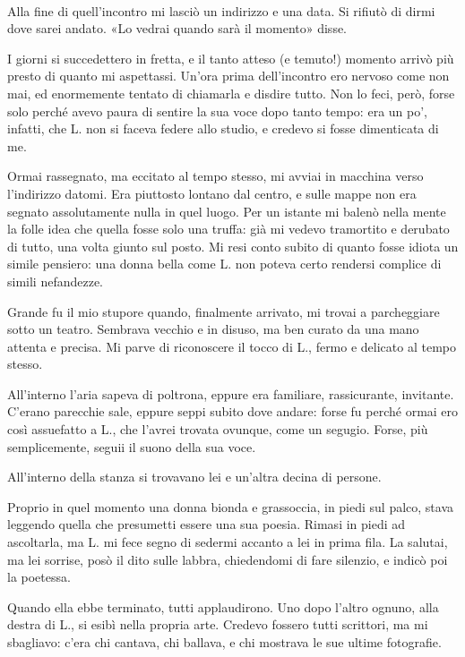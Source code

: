 \documentclass[a4paper,12pt]{book}
\begin{document}
\paragraph{}
Alla fine di quell’incontro mi lasciò un indirizzo e una data. Si rifiutò di
dirmi dove sarei andato. «Lo vedrai quando sarà il momento» disse.

I giorni si succedettero in fretta, e il tanto atteso (e temuto!) momento
arrivò più presto di quanto mi aspettassi. Un’ora prima dell’incontro ero
nervoso come non mai, ed enormemente tentato di chiamarla e disdire tutto. Non
lo feci, però, forse solo perché avevo paura di sentire la sua voce dopo tanto
tempo: era un po’, infatti, che L. non si faceva federe allo studio, e credevo
si fosse dimenticata di me.

Ormai rassegnato, ma eccitato al tempo stesso, mi avviai in macchina verso
l’indirizzo datomi. Era piuttosto lontano dal centro, e sulle mappe non era
segnato assolutamente nulla in quel luogo. Per un istante mi balenò nella mente
la folle idea che quella fosse solo una truffa: già mi vedevo tramortito e
derubato di tutto, una volta giunto sul posto. Mi resi conto subito di quanto
fosse idiota un simile pensiero: una donna bella come L. non poteva certo
rendersi complice di simili nefandezze.

Grande fu il mio stupore quando, finalmente arrivato, mi trovai a parcheggiare
sotto un teatro. Sembrava vecchio e in disuso, ma ben curato da una mano attenta
e precisa. Mi parve di riconoscere il tocco di L., fermo e delicato al tempo
stesso.

All’interno l’aria sapeva di poltrona, eppure era familiare, rassicurante,
invitante. C’erano parecchie sale, eppure seppi subito dove andare: forse fu
perché ormai ero così assuefatto a L., che l’avrei trovata ovunque, come un
segugio. Forse, più semplicemente, seguii il suono della sua voce.

All’interno della stanza si trovavano lei e un’altra decina di persone.

Proprio in quel momento una donna bionda e grassoccia, in piedi sul palco, stava
leggendo quella che presumetti essere una sua poesia. Rimasi in piedi ad
ascoltarla, ma L. mi fece segno di sedermi accanto a lei in prima fila. La
salutai, ma lei sorrise, posò il dito sulle labbra, chiedendomi di fare
silenzio, e indicò poi la poetessa.

Quando ella ebbe terminato, tutti applaudirono. Uno dopo l’altro ognuno, alla
destra di L., si esibì nella propria arte. Credevo fossero tutti scrittori, ma
mi sbagliavo: c’era chi cantava, chi ballava, e chi mostrava le sue ultime
fotografie.
\end{document}
